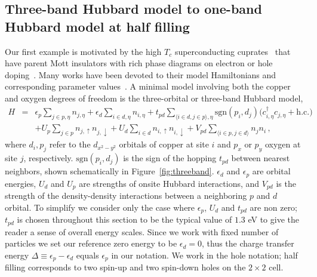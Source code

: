 \subsection{Three-band Hubbard model to one-band Hubbard model at half filling}
\label{subsection:3band} 
Our first example is motivated by the high $T_c$ superconducting cuprates~\cite{Bednorz1986} that 
have parent Mott insulators with rich phase diagrams on electron or hole doping~\cite{Dagotto_RevModPhys, LeeWen_RevModPhys}. 
Many works have been devoted to their model Hamiltonians and corresponding parameter 
values~\cite{tJSpalek, Pavirini, Emery, ZhangRice, Hybertsen_PRB1989, Hybertsen_PRB1990, Kent_Hubbard}. 
A minimal model involving both the copper and oxygen degrees of freedom 
is the three-orbital or three-band Hubbard model, 
\begin{eqnarray}
H &=&    \epsilon_p \sum_{j\in p,\eta} n_{j,\eta} + \epsilon_{d} \sum_{i \in d,\eta}  n_{i,\eta} 
        + t_{pd} \sum_{\langle i\in d ,j \in p \rangle, \eta} \text{sgn}(p_i,d_j) \Big( c_{i,\eta}^{\dagger} c_{j,\eta} + \text{h.c.} \Big) \nonumber \\
          & &   + U_p \sum_{j\in p} n_{j,\uparrow} n_{j,\downarrow} + U_d \sum_{i\in d} n_{i,\uparrow} n_{i,\downarrow} + V_{pd} \sum_{\langle i \in p ,j \in d \rangle} n_j n_i\,,
\end{eqnarray}
where $d_i,p_j$ refer to the  $d_{x^2 - y^2}$ orbitals of copper at site $i$ and $p_x$ or $p_y$ 
oxygen at site $j$, respectively. 
$\text{sgn}(p_i,d_j)$ is the sign of the hopping $t_{pd}$ 
between nearest neighbors, shown schematically in Figure~\ref{fig:threeband}. 
$\epsilon_d$ and $\epsilon_p$ are orbital energies, $U_d$ and $U_p$ are strengths of onsite Hubbard interactions,  
and $V_{pd}$ is the strength of the density-density interactions between a neighboring $p$ and $d$ orbital. 
To simplify we consider only the case where $\epsilon_p$, $U_d$ and $t_{pd}$ are non zero; $t_{pd}$ is chosen throughout this section to be the typical value of $1.3$ eV to give the reader a sense of overall energy scales. 
Since we work with fixed number of particles we set our reference zero energy to be $\epsilon_d = 0$, thus the charge transfer energy $\Delta \equiv \epsilon_p - \epsilon_d$ equals $\epsilon_p$ in our notation. 
We work in the hole notation; half filling corresponds to two spin-up and two spin-down holes on the $2\times2$ cell.

